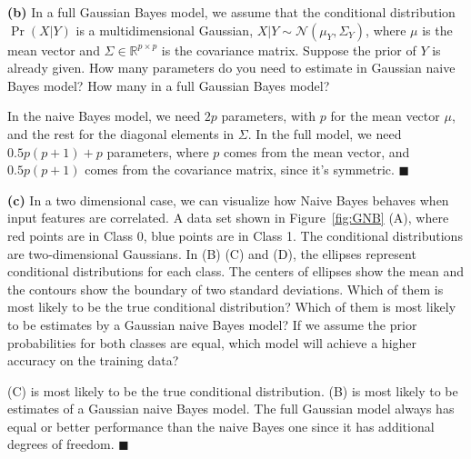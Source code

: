 \documentclass[11pt]{article}
\newcounter{marks}
\def\maxmarks#1{\extramark{#1}\addtocounter{marks}{#1}}
\def\extramark#1{
  \begin{flushright}
  [\emph{#1 points}]
  \end{flushright}
}
\renewcommand{\part}[1] {\vspace{.10in} {\bf (#1)}}
\begin{document}
 \part{b} 
In a full Gaussian Bayes model, we assume  that the conditional distribution 
$\Pr(X|Y)$ is a multidimensional Gaussian,  $X|Y \sim \mathcal{N}(\mu_Y, \Sigma_Y)$, where $\mu$ is the mean vector and $\Sigma \in \mathbb{R}^{p\times p}$ is the covariance matrix.  
Suppose the prior of $Y$ is already given.
How many parameters do you need to estimate in Gaussian naive Bayes model? How many in a full Gaussian Bayes model? 
\maxmarks{3}

{\color{blue} In the naive Bayes model, we need $2p$ parameters, with $p$ for the mean vector $\mu$, and the rest 
for the diagonal elements in $\Sigma$. In the full model, we need $0.5p(p+1)+p$ parameters, where $p$ comes
from the mean vector, and $0.5p(p+1)$ comes from the covariance matrix, since it's symmetric. \hfill$\blacksquare$ }
    
\part{c} In a two dimensional case, we can visualize how Naive Bayes behaves when input features are correlated.  
    A data set shown in Figure~\ref{fig:GNB} (A), 
    where red points are in Class 0, blue points are in Class 1.  
	The conditional distributions are two-dimensional Gaussians. 
	In (B) (C) and (D), the ellipses represent conditional distributions for each class. 
	The centers of ellipses show the mean and the contours show the boundary of two standard deviations. 	
	Which of them is most likely to be the true conditional distribution?
	Which of them is most likely to be estimates by a Gaussian naive Bayes model?
	If we assume the prior probabilities for both classes are equal, 
	which model will achieve a higher accuracy on the training data? \maxmarks{3}

{\color{blue} (C) is most likely to be the true conditional distribution. (B) is most likely
to be estimates of a Gaussian naive Bayes model. The full Gaussian model always has equal 
or better performance than the naive Bayes one since it has additional degrees of freedom. \hfill$\blacksquare$ }
\end{document}
